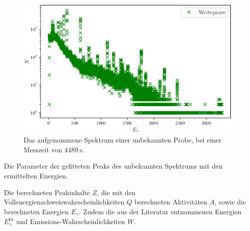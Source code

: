 \begin{figure}
	\centering
	\includegraphics[width=\linewidth-70pt,height=\textheight-70pt,keepaspectratio]{content/images/unbekannt.png}
	\caption{Das aufgenommene Spektrum einer unbekannten Probe, bei einer Messzeit von $\SI{4489}{\second}$.}
	\label{fig:SpektrumUnbekannt}
\end{figure}

\begin{table}
	\centering
	\caption{Die Parameter der gefitteten Peaks des unbekannten Spektrums mit den ermittelten Energien.}
	
	\label{tab:parameterUnbekannt}
\end{table}

\begin{table}
	\centering
	\caption{Die berechneten Peakinhalte $Z$, die mit den Vollenergienachweiswahrscheinlichkeiten $Q$ berechneten Aktivitäten $A$, sowie die berechneten Energien $E_\gamma$. Zudem die aus der Literatur entnommenen Energien $E_\gamma^\text{lit}$ und Emissions-Wahrscheinlichkeiten $W$.}
	
	\label{tab:AUnbekannt}
\end{table}

